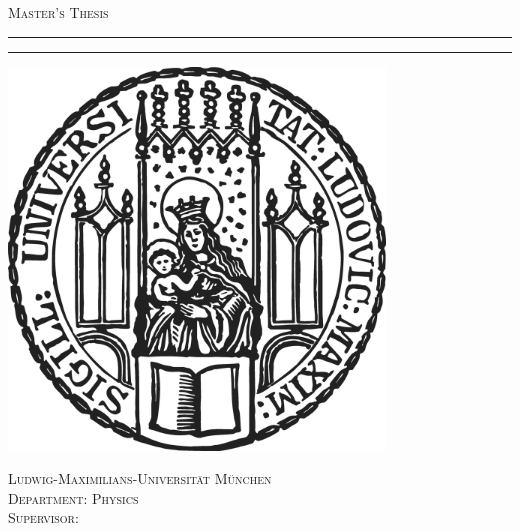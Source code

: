 \begin{titlepage}
    \begin{center}
        \thispagestyle{empty}

        \textsc{\Large Master's Thesis}



        \rule{\linewidth}{.2em}\vspace*{-0.1cm}
        \begin{center}
            \fontsize{30pt}{25pt}\selectfont \englishtitle

        \end{center}\vspace*{-0.1cm}
        \rule{\linewidth}{.2em}

        \textsc{\Large \authorname}


        \includegraphics[width=10cm]{figures/lmu_logo}


        \textsc{\linespread{1}\large
        Ludwig-Maximilians-Universität München\\
        Department: Physics\\
        Supervisor: \supervisor\\
        \vspace{\baselineskip}
        \englishsubmissiondate
        }
    \end{center}
    \afterpage{\blankpage}
    \newpage
\end{titlepage}

